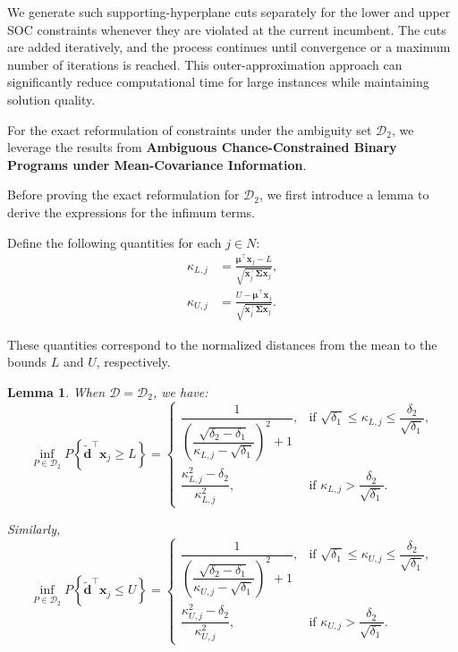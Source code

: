 \documentclass[preprint,12pt,authoryear]{elsarticle}
\newtheorem{lemma}{Lemma}
\begin{document}
We generate such supporting-hyperplane cuts separately for the lower and upper SOC constraints whenever they are violated at the current incumbent. The cuts are added iteratively, and the process continues until convergence or a maximum number of iterations is reached. This outer-approximation approach can significantly reduce computational time for large instances while maintaining solution quality.


For the exact reformulation of constraints under the ambiguity set $\mathcal{D}_2$, we leverage the results from \textbf{Ambiguous Chance-Constrained Binary Programs under Mean-Covariance Information}.

Before proving the exact reformulation for $\mathcal{D}_2$, we first introduce a lemma to derive the expressions for the infimum terms.

Define the following quantities for each $j \in N$:
\begin{align}
\kappa_{L,j} &= \frac{\boldsymbol{\mu}^{\top} \mathbf{x}_{j} - L}{\sqrt{\mathbf{x}_{j}^{\top} \boldsymbol{\Sigma} \mathbf{x}_{j}}}, \\
\kappa_{U,j} &= \frac{U - \boldsymbol{\mu}^{\top} \mathbf{x}_{j}}{\sqrt{\mathbf{x}_{j}^{\top} \boldsymbol{\Sigma} \mathbf{x}_{j}}}.
\end{align}

These quantities correspond to the normalized distances from the mean to the bounds $L$ and $U$, respectively.

\begin{lemma}\label{lem:dricc_d2_inf}
When $\mathcal{D} = \mathcal{D}_2$, we have:
\begin{equation}
\inf_{P \in \mathcal{D}_{2}} P\left\{ \widetilde{\mathbf{d}}^{\top} \mathbf{x}_{j} \geqslant L \right\} = 
\begin{cases}
\dfrac{1}{\left( \dfrac{\sqrt{\delta_2 - \delta_1}}{\kappa_{L,j} - \sqrt{\delta_1}} \right)^{2} + 1}, & \text{if } \sqrt{\delta_1} \leqslant \kappa_{L,j} \leqslant \dfrac{\delta_2}{\sqrt{\delta_1}}, \\[3ex]
\dfrac{\kappa_{L,j}^{2} - \delta_2}{\kappa_{L,j}^{2}}, & \text{if } \kappa_{L,j} > \dfrac{\delta_2}{\sqrt{\delta_1}}.
\end{cases}
\label{eq:inf_P_L}
\end{equation}

Similarly,
\begin{equation}
\inf_{P \in \mathcal{D}_{2}} P\left\{ \widetilde{\mathbf{d}}^{\top} \mathbf{x}_{j} \leqslant U \right\} = 
\begin{cases}
\dfrac{1}{\left( \dfrac{\sqrt{\delta_2 - \delta_1}}{\kappa_{U,j} - \sqrt{\delta_1}} \right)^{2} + 1}, & \text{if } \sqrt{\delta_1} \leqslant \kappa_{U,j} \leqslant \dfrac{\delta_2}{\sqrt{\delta_1}}, \\[3ex]
\dfrac{\kappa_{U,j}^{2} - \delta_2}{\kappa_{U,j}^{2}}, & \text{if } \kappa_{U,j} > \dfrac{\delta_2}{\sqrt{\delta_1}}.
\end{cases}
\label{eq:inf_P_U}
\end{equation}
\end{lemma}
\end{document}
